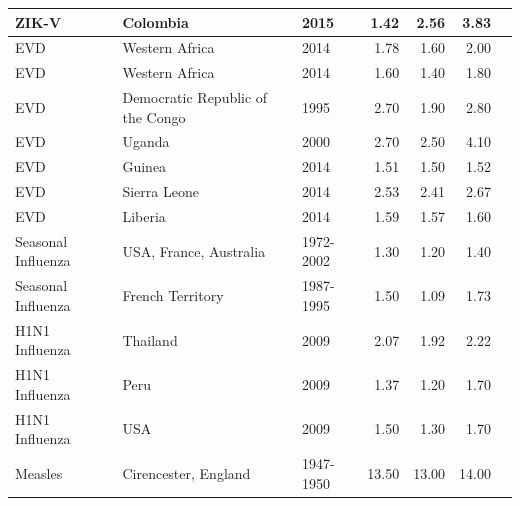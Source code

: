 \documentclass[12pt]{article}
\begin{document}
\begin{landscape}
\begin{table}[H]
\begin{tabular}{@{}lllrrrl@{}}
ZIK-V                & Colombia                         & 2015                          & 1.42        & 2.56           & 3.83           & \cite{majumder2016}  \\ \hline
EVD               & Western Africa                   & 2014                          & 1.78        & 1.60            & 2.00              & \cite{fisman2014}   \\
EVD & Western Africa                   & 2014                          & 1.60         & 1.40            & 1.80            & \cite{towers2014}  \\
EVD                 & Democratic Republic of the Congo & 1995                          & 2.70         & 1.90            & 2.80            & \cite{legrand2007}  \\
EVD                 & Uganda                           & 2000                          & 2.70         & 2.50            & 4.10            & \cite{legrand2007}  \\
EVD                 & Guinea                           & 2014                          & 1.51        & 1.50            & 1.52           & \cite{althaus2014}   \\
EVD                 & Sierra Leone                     & 2014                          & 2.53        & 2.41           & 2.67           & \cite{althaus2014}      \\
EVD                 & Liberia                          & 2014                          & 1.59        & 1.57           & 1.60            & \cite{althaus2014}    \\ \hline
Seasonal Influenza  & USA, France, Australia           & 1972-2002 & 1.30         & 1.20            & 1.40            & \cite{chowell2008}  \\
Seasonal Influenza  & French Territory                 & 1987-1995                     & 1.50         & 1.09           & 1.73           & \cite{bonabeau1998}  \\ \hline
H1N1 Influenza      & Thailand                         & 2009                          & 2.07        & 1.92           & 2.22           & \cite{desilva2009}     \\
  H1N1 Influenza     & Peru                             & 2009                          & 1.37        & 1.20            & 1.70            & \cite{desilva2009}        \\ 
  H1N1 Influenza & USA & 2009 & 1.50 & 1.30 & 1.70 &\cite{towers2009} \\ \hline
Measles      & Cirencester, England                 & 1947-1950                          & 13.50   & 13.00           & 14.00            & \cite{fraser2009}     \\ 

\end{tabular}
\end{table}
\end{landscape}
\end{document}
